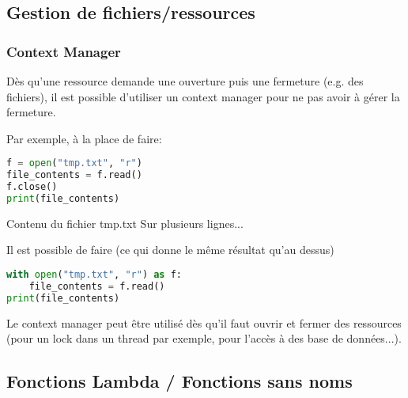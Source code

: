 \subsection{Gestion de fichiers/ressources}

\subsubsection{Context Manager}

Dès qu'une ressource demande une ouverture puis une fermeture (e.g. des fichiers), il est possible d'utiliser un context manager pour ne pas avoir à gérer la fermeture.


Par exemple, à la place de faire:

\begin{lstlisting}[language=Python]
f = open("tmp.txt", "r")
file_contents = f.read()
f.close()
print(file_contents)
\end{lstlisting}

\begin{terminal}
Contenu du fichier tmp.txt
Sur plusieurs lignes...
\end{terminal}

Il est possible de faire (ce qui donne le même résultat qu'au dessus)
\begin{lstlisting}[language=Python]
with open("tmp.txt", "r") as f:
    file_contents = f.read()
print(file_contents)
\end{lstlisting}

Le context manager peut être utilisé dès qu'il faut ouvrir et fermer des ressources (pour un lock dans un thread par exemple, pour l'accès à des base de données...).

\subsection{Fonctions Lambda / Fonctions sans noms}




